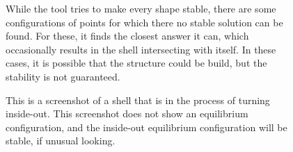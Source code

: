 \documentclass{thesis}
\begin{document}
\begin{figure}
\caption[Results of user error]{While the tool tries to make every shape stable, there are some configurations of points
for which there no stable solution can be found.  For these, it finds the closest answer it can, which occasionally results
in the shell intersecting with itself.  In these cases, it is possible that the structure could be build, but the stability
is not guaranteed.}
\label{fig:highly_improbably}
\end{figure}

\begin{figure}
\caption[Transient error]{This is a screenshot of a shell that is in the process of turning inside-out.  This screenshot does not
show an equilibrium configuration, and the inside-out equilibrium configuration will be stable, if unusual looking.}
\label{fig:inside_out_transient}
\end{figure}
\end{document}
